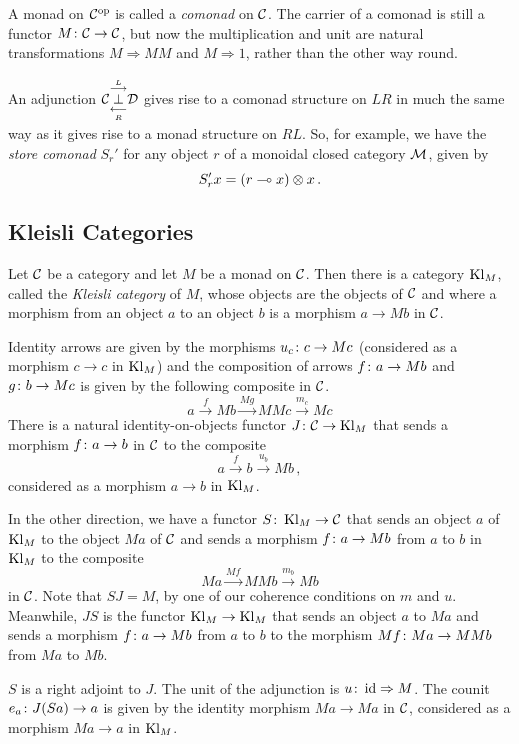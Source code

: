 \documentclass{article}
\begin{document}
\begin{example}
  A monad on $\oppcat\C$ is called a \emph{comonad} on $\C$.  
  The carrier of a comonad is still a functor $M\from \C\to\C$, but now the multiplication and unit are natural transformations $M\Rightarrow MM$ and $M\Rightarrow 1$, rather than the other way round.  

  An adjunction $\adjunction\C LR\D$ gives rise to a comonad structure on $LR$ in much the same way as it gives rise to a monad structure on $RL$.  
  So, for example, we have the \emph{store comonad} $S_r'$ for any object $r$ of a monoidal closed category $\M$, given by
  \[
    S_r'x = (r \implies x) \tensor x\,.
    \]
\end{example}

\subsection{Kleisli Categories}

Let $\C$ be a category and let $M$ be a monad on $\C$.  
Then \cite{Kleisli} there is a category $\Kl_M$, called the \emph{Kleisli category} of $M$, whose objects are the objects of $\C$ and where a morphism from an object $a$ to an object $b$ is a morphism $a \to Mb$ in $\C$.

Identity arrows are given by the morphisms $u_c\from c \to M c$ (considered as a morphism $c\to c$ in $\Kl_M$) and the composition of arrows $f\from a \to Mb$ and $g \from b \to Mc$ is given by the following composite in $\C$.
\[
  a \xrightarrow{f}
  Mb \xrightarrow{Mg}
  MMc \xrightarrow{m_c}
  M c
  \]
There is a natural identity-on-objects functor $J\from \C \to \Kl_M$ that sends a morphism $f\from a \to b$ in $\C$ to the composite
\[
  a \xrightarrow{f}
  b \xrightarrow{u_b}
  M b\,,
  \]
considered as a morphism $a\to b$ in $\Kl_M$.

In the other direction, we have a functor $ S \from \Kl_M \to \C$ that sends an object $a$ of $\Kl_M$ to the object $Ma$ of $\C$ and sends a morphism $f\from a \to M b$ from $a$ to $b$ in $\Kl_M$ to the composite
\[
  Ma \xrightarrow{M f}
  MMb \xrightarrow{m_b}
  Mb
  \]
in $\C$.  
Note that $ S J=M$, by one of our coherence conditions on $m$ and $u$.
Meanwhile, $J S $ is the functor $\Kl_M\to\Kl_M$ that sends an object $a$ to $Ma$ and sends a morphism $f\from a \to Mb$ from $a$ to $b$ to the morphism $Mf\from Ma \to MMb$ from $Ma$ to $Mb$.
\begin{proposition}
  $ S $ is a right adjoint to $J$.
  The unit of the adjunction is $u\from \id \Rightarrow M$.  
  The counit $e_a\from J( S  a) \to a$ is given by the identity morphism $Ma \to Ma$ in $\C$, considered as a morphism $Ma \to a$ in $\Kl_M$.
  \label{prop:KleisliHasAdjunction}
\end{proposition}
\end{document}

